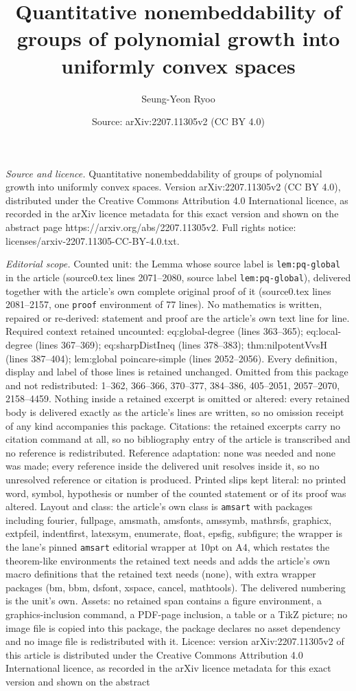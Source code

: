 \documentclass[10pt,a4paper]{amsart}
\title[Quantitative nonembeddability of groups of polynomial growth]{Quantitative nonembeddability of groups of polynomial growth into uniformly convex spaces}
\author{Seung-Yeon Ryoo}
\date{Source: arXiv:2207.11305v2 (CC BY 4.0)}
\begin{document}
\maketitle

\noindent\emph{Source and licence.} Quantitative nonembeddability of groups of polynomial growth into uniformly convex spaces. Version arXiv:2207.11305v2 (CC BY 4.0), distributed under the Creative Commons Attribution 4.0 International licence, as recorded in the arXiv licence metadata for this exact version and shown on the abstract page https://arxiv.org/abs/2207.11305v2. Full rights notice: licenses/arxiv-2207.11305-CC-BY-4.0.txt.\par\smallskip

\noindent\textit{Editorial scope.} Counted unit: the Lemma whose source label is \texttt{lem:pq-global} in the article (source0.tex lines 2071--2080, source label \texttt{lem:pq-global}), delivered together with the article's own complete original proof of it (source0.tex lines 2081--2157, one \texttt{proof} environment of 77 lines). No mathematics is written, repaired or re-derived: statement and proof are the article's own text line for line. Required context retained uncounted: eq:global-degree (lines 363--365); eq:local-degree (lines 367--369); eq:sharpDistIneq (lines 378--383); thm:nilpotentVvsH (lines 387--404); lem:global poincare-simple (lines 2052--2056). Every definition, display and label of those lines is retained unchanged. Omitted from this package and not redistributed: 1--362, 366--366, 370--377, 384--386, 405--2051, 2057--2070, 2158--4459. Nothing inside a retained excerpt is omitted or altered: every retained body is delivered exactly as the article's lines are written, so no omission receipt of any kind accompanies this package. Citations: the retained excerpts carry no citation command at all, so no bibliography entry of the article is transcribed and no reference is redistributed. Reference adaptation: none was needed and none was made; every reference inside the delivered unit resolves inside it, so no unresolved reference or citation is produced. Printed slips kept literal: no printed word, symbol, hypothesis or number of the counted statement or of its proof was altered. Layout and class: the article's own class is \texttt{amsart} with packages including fourier, fullpage, amsmath, amsfonts, amssymb, mathrsfs, graphicx, extpfeil, indentfirst, latexsym, enumerate, float, epsfig, subfigure; the wrapper is the lane's pinned \texttt{amsart} editorial wrapper at 10pt on A4, which restates the theorem-like environments the retained text needs and adds the article's own macro definitions that the retained text needs (none), with extra wrapper packages (bm, bbm, dsfont, xspace, cancel, mathtools). The delivered numbering is the unit's own. Assets: no retained span contains a figure environment, a graphics-inclusion command, a PDF-page inclusion, a table or a TikZ picture; no image file is copied into this package, the package declares no asset dependency and no image file is redistributed with it. Licence: version arXiv:2207.11305v2 of this article is distributed under the Creative Commons Attribution 4.0 International licence, as recorded in the arXiv licence metadata for this exact version and shown on the abstract 
\end{document}
